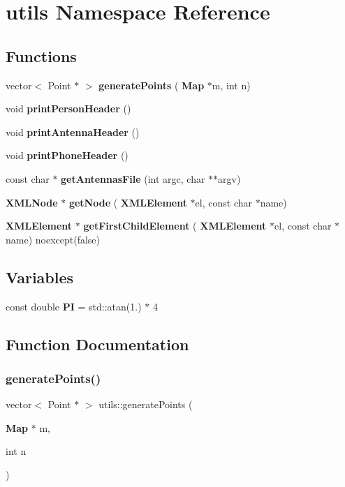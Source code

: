 \section{utils Namespace Reference}
\label{namespaceutils}
\subsection*{Functions}
\begin{DoxyCompactItemize}
\item 
vector$<$ Point $\ast$ $>$ \textbf{ generate\+Points} (\textbf{ Map} $\ast$m, int n)
\item 
void \textbf{ print\+Person\+Header} ()
\item 
void \textbf{ print\+Antenna\+Header} ()
\item 
void \textbf{ print\+Phone\+Header} ()
\item 
const char $\ast$ \textbf{ get\+Antennas\+File} (int argc, char $\ast$$\ast$argv)
\item 
\textbf{ X\+M\+L\+Node} $\ast$ \textbf{ get\+Node} (\textbf{ X\+M\+L\+Element} $\ast$el, const char $\ast$name)
\item 
\textbf{ X\+M\+L\+Element} $\ast$ \textbf{ get\+First\+Child\+Element} (\textbf{ X\+M\+L\+Element} $\ast$el, const char $\ast$name) noexcept(false)
\end{DoxyCompactItemize}
\subsection*{Variables}
\begin{DoxyCompactItemize}
\item 
const double \textbf{ PI} = std\+::atan(1.) $\ast$ 4
\end{DoxyCompactItemize}


\subsection{Function Documentation}
\mbox{\label{namespaceutils_a6b3f4ddb6d0aeaf5a9f0125130af14bb}} 
\subsubsection{generatePoints()}
{\footnotesize\ttfamily vector$<$ Point $\ast$ $>$ utils\+::generate\+Points (\begin{DoxyParamCaption}\item[{\textbf{ Map} $\ast$}]{m,  }\item[{int}]{n }\end{DoxyParamCaption})}




